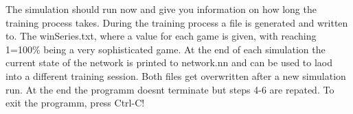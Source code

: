 The simulation should run now and give you information on how long the training process takes. During the training process a file is generated and written to. The win\+Series.\+txt, where a value for each game is given, with reaching 1=100\% being a very sophisticated game. At the end of each simulation the current state of the network is printed to \textquotesingle{}network.\+nn\textquotesingle{} and can be used to laod into a different training session. Both files get overwritten after a new simulation run. At the end the programm doesn\textquotesingle{}t terminate but steps 4-\/6 are repated. To exit the programm, press \textquotesingle{}Ctrl-\/C\textquotesingle{}! 